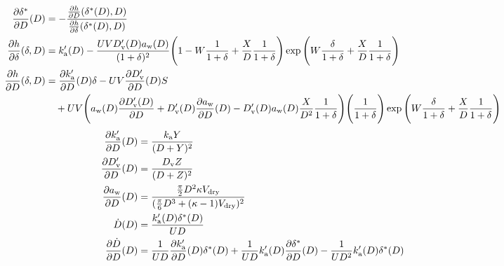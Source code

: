 \documentclass{article}
\begin{document}
\begin{align}
  \frac{\partial \delta^*}{\partial D}(D)
  &= - \frac{\frac{\partial h}{\partial D}(\delta^*(D), D)}{\frac{\partial h}{\partial \delta}(\delta^*(D), D)} \\
  \frac{\partial h}{\partial \delta}(\delta, D) &= k_{\rm a}'(D) -
  \frac{U V D_{\rm v}'(D) a_{\rm w}(D)}{(1 + \delta)^2} \Biggl( 1 - W \frac{1}{1+\delta}
  + \frac{X}{D} \frac{1}{1+\delta} \Biggr) \exp{\Biggl(W \frac{\delta}{1+\delta} +
      \frac{X}{D} \frac{1}{1+\delta}\Biggr)} \\
  \frac{\partial h}{\partial D}(\delta, D) &=
  \frac{\partial k_{\rm a}'}{\partial D}(D) \delta
  - U V \frac{\partial D_{\rm v}'}{\partial D}(D) S \nonumber \\
  &\quad + U V \Biggl( a_{\rm w}(D) \frac{\partial D_{\rm v}'(D)}{\partial D}+ D_{\rm v}'(D) \frac{\partial a_{\rm w}}{\partial D}(D)
  - D_{\rm v}'(D) a_{\rm w}(D) \frac{X}{D^2} \frac{1}{1 + \delta} \Biggr)
  \Biggl(\frac{1}{1+\delta}\Biggr)
  \exp{\Biggl(W \frac{\delta}{1+\delta} + \frac{X}{D} \frac{1}{1+\delta}\Biggr)}
\end{align}
\begin{align}
  \frac{\partial k_{\rm a}'}{\partial D}(D) &= \frac{k_{\rm a} Y}{(D+Y)^2} \\
  \frac{\partial D_{\rm v}'}{\partial D}(D) &= \frac{D_{\rm v} Z}{(D+Z)^2} \\
  \frac{\partial a_{\rm w}}{\partial D}(D) &= \frac{\frac{\pi}{2}D^2 \kappa V_{\rm dry}}{(\frac{\pi}{6}D^3 + (\kappa - 1) V_{\rm dry})^2} \\
  \dot{D}(D) &= \frac{k_{\rm a}'(D) \delta^*(D)}{U D} \\
  \frac{\partial \dot{D}}{\partial D}(D) &=
\frac{1}{U D} 
\frac{\partial k_{\rm a}'}{\partial D}(D) \delta^*(D)
+ \frac{1}{U D} k_{\rm a}'(D) \frac{\partial \delta^*}{\partial D}(D)
- \frac{1}{U D^2} k_{\rm a}'(D) \delta^*(D)
\end{align}

\end{document}
